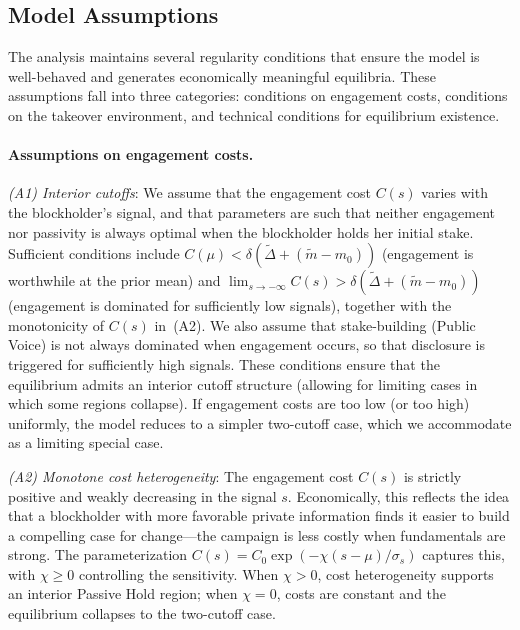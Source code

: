 \documentclass[11pt]{article}
\newcommand{\1}{\mathbf{1}}
\begin{document}
\subsection{Model Assumptions}
\label{sec:assumptions}

The analysis maintains several regularity conditions that ensure the model is well-behaved and generates economically meaningful equilibria. These assumptions fall into three categories: conditions on engagement costs, conditions on the takeover environment, and technical conditions for equilibrium existence.

\paragraph{Assumptions on engagement costs.}
\textit{(A1) Interior cutoffs}: We assume that the engagement cost $C(s)$ varies with the blockholder's signal, and that parameters are such that neither engagement nor passivity is always optimal when the blockholder holds her initial stake. Sufficient conditions include $C(\mu) < \delta(\tilde{\Delta} + (\tilde{m}-m_0))$ (engagement is worthwhile at the prior mean) and $\lim_{s\to-\infty} C(s) > \delta(\tilde{\Delta} + (\tilde{m}-m_0))$ (engagement is dominated for sufficiently low signals), together with the monotonicity of $C(s)$ in~\textup{(A2)}. We also assume that stake-building (Public Voice) is not always dominated when engagement occurs, so that disclosure is triggered for sufficiently high signals. These conditions ensure that the equilibrium admits an interior cutoff structure (allowing for limiting cases in which some regions collapse). If engagement costs are too low (or too high) uniformly, the model reduces to a simpler two-cutoff case, which we accommodate as a limiting special case.

\textit{(A2) Monotone cost heterogeneity}: The engagement cost $C(s)$ is strictly positive and weakly decreasing in the signal $s$. Economically, this reflects the idea that a blockholder with more favorable private information finds it easier to build a compelling case for change---the campaign is less costly when fundamentals are strong. The parameterization $C(s)=C_0\exp(-\chi(s-\mu)/\sigma_s)$ captures this, with $\chi\geq0$ controlling the sensitivity. When $\chi>0$, cost heterogeneity supports an interior Passive Hold region; when $\chi=0$, costs are constant and the equilibrium collapses to the two-cutoff case.
\end{document}
